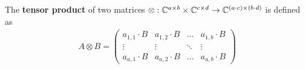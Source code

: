 The \textbf{tensor product} of two matrices $\otimes: \mathbb{C}^{a \times b} \times \mathbb{C}^{c \times d} \to \mathbb{C}^{(a \cdot c) \times (b \cdot d)}$ is defined as
\begin{align}
    A \otimes B = \begin{pmatrix}
        a_{1, 1} \cdot B & a_{1, 2} \cdot B & \ldots & a_{1, b} \cdot B \\
        \vdots & \vdots & \ddots & \vdots \\
        a_{a, 1} \cdot B & a_{a, 2} \cdot B & \ldots & a_{a, b} \cdot B
    \end{pmatrix}
\end{align}
